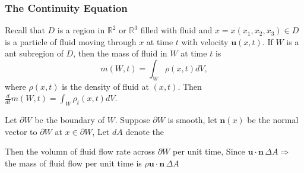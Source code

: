 \subsubsection{The Continuity Equation} %

Recall that $D$ is a region in $\mathbb{R}^2$ or $\mathbb{R}^3$ filled with fluid and $x=x(x_1,x_2,x_3)\in D$ is a particle of fluid moving through $x$ at time $t$ with velocity $\textbf{u}(x,t)$. If $W$ is a ant subregion of $D$, then  the mass of fluid in $W$ at time $t$ is 
\begin{equation}
m(W,t) = \int_{W} \rho(x,t)dV,
\end{equation}
where $\rho(x,t)$ is the density of fluid at $(x,t)$. Then $\displaystyle \frac{d}{dt}m(W,t) = \int_W \rho_t (x,t) dV$.

\begin{center}\end{center}

Let $\partial W$ be the boundary of $W$. Suppose $\partial W$ is smooth, let $\textbf{n}(x)$ be the normal vector to $\partial W$ at $x\in \partial W$, Let $dA$ denote the 

Then the volumn of fluid flow rate across $\partial W$ per unit time, Since $\textbf{u}\cdot \textbf{n}\, \Delta A$$\Rightarrow$ the mass of fluid flow per unit time is $\rho \textbf{u}\cdot \textbf{n}\, \Delta A$

